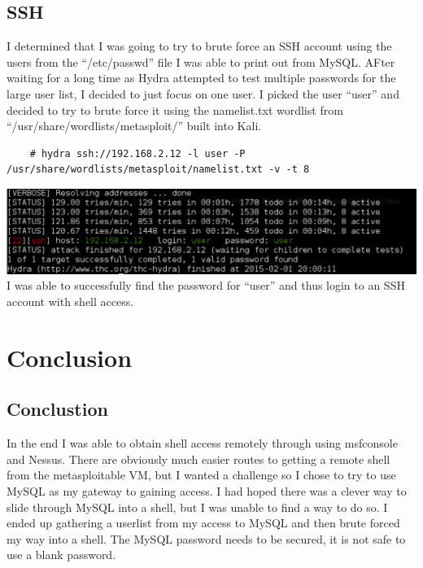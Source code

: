\documentclass[12pt]{report}
\newcommand{\mychapter}[2]{
    \setcounter{chapter}{#1}
    \setcounter{section}{0}
    \chapter*{#2}
    \addcontentsline{toc}{chapter}{#2}
}
\begin{document}
\section{SSH}
I determined that I was going to try to brute force an SSH account using the users from the ``/etc/passwd'' file I was able to print out from MySQL. AFter waiting for a long time as Hydra attempted to test multiple passwords for the large user list, I decided to just focus on one user. I picked the user ``user'' and decided to try to brute force it using the namelist.txt wordlist from ``/usr/share/wordlists/metasploit/'' built into Kali. 
	\begin{verbatim}
	# hydra ssh://192.168.2.12 -l user -P /usr/share/wordlists/metasploit/namelist.txt -v -t 8
	\end{verbatim}
\includegraphics[scale=0.33, width=\linewidth]{find_the_login.PNG}
\newline
I was able to successfully find the password for ``user'' and thus login to an SSH account with shell access.
\clearpage

\mychapter{3}{Conclusion}
\section{Conclustion}
In the end I was able to obtain shell access remotely through using msfconsole and Nessus. There are obviously much easier routes to getting a remote shell from the metasploitable VM, but I wanted a challenge so I chose to try to use MySQL as my gateway to gaining access. I had hoped there was a clever way to slide through MySQL into a shell, but I was unable to find a way to do so. I ended up gathering a userlist from my access to MySQL and then brute forced my way into a shell. The MySQL password needs to be secured, it is not safe to use a blank password.
\end{document}
